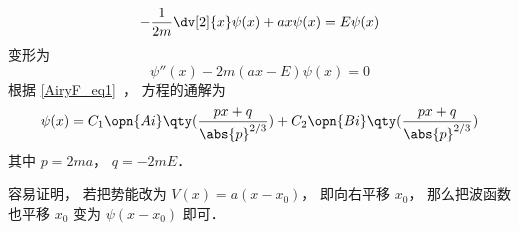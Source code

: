 

\begin{equation}
-\frac{1}{2m}\dv[2]{x}\psi(x) + ax \psi(x) = E\psi(x)
\end{equation}
变形为
\begin{equation}
\psi''(x) - 2m(ax - E)\psi(x) = 0
\end{equation}
根据 \autoref{AiryF_eq1}~， 方程的通解为
\begin{equation}
\psi(x) = C_1\opn{Ai}\qty(\frac{px+q}{\abs{p}^{2/3}}) + C_2 \opn{Bi}\qty(\frac{px+q}{\abs{p}^{2/3}})
\end{equation}
其中 $p = 2ma$， $q = -2mE$．

容易证明， 若把势能改为 $V(x) = a(x-x_0)$， 即向右平移 $x_0$， 那么把波函数也平移 $x_0$ 变为 $\psi(x-x_0)$ 即可．
